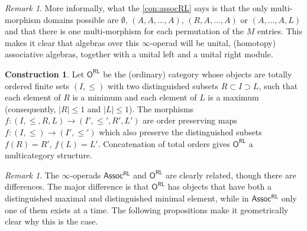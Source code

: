 \documentclass[12pt,a4paper]{article}
\newcounter{counter} \numberwithin{counter}{section}
\theoremstyle{definition}
\newtheorem{construction}[counter]{Construction}
\theoremstyle{plain}
\theoremstyle{remark}
\newtheorem{remark}[counter]{Remark}
\begin{document}
\begin{remark}
    More informally, what the \cref{con:assocRL} says is that the only multi-morphism domains possible are $\emptyset$, $(A,A,\dots,A)$, $(R,A,\dots,A)$ or $(A,\dots,A, L)$ and that there is one multi-morphism for each permutation of the $M$ entries. This makes it clear that algebras over this $\infty$-operad will be unital, (homotopy) associative algebras, together with a unital left and a unital right module.
\end{remark}

\begin{construction}
    Let $\mathsf{O^{RL}}$ be the (ordinary) category whose objects are totally ordered finite sets $(I, \leq)$ with two distinguished subsets $R \subset I \supset L$, such that each element of $R$ is a minimum and each element of $L$ is a maximum (consequently, $|R| \leq 1$ and $|L| \leq 1$). The morphisms $f:(I, \leq, R, L) \rightarrow (I', \leq', R', L')$ are order preserving maps $f: (I,\leq) \rightarrow (I', \leq')$ which also preserve the distinguished subsets $f(R) = R'$, $f(L) = L'$. Concatenation of total orders gives $\mathsf{O^{RL}}$ a multicategory structure.
\end{construction}

\begin{remark}
    The $\infty$-operads $\mathsf{Assoc^{RL}}$ and $\mathsf{O^{RL}}$ are clearly related, though there are differences. The major difference is that $\mathsf{O^{RL}}$ has objects that have both a distinguished maximal and distinguished minimal element, while in $\mathsf{Assoc^{RL}}$ only one of them exists at a time. The following propositions make it geometrically clear why this is the case.
\end{remark}
\end{document}

